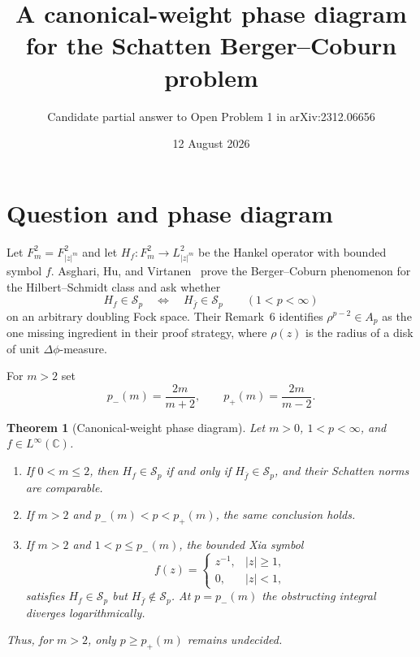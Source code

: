 \documentclass[11pt]{article}
\title{A canonical-weight phase diagram for the Schatten Berger--Coburn problem}
\author{Candidate partial answer to Open Problem 1 in arXiv:2312.06656}
\date{12 August 2026}
\newtheorem{theorem}{Theorem}
\newcommand{\C}{\mathbb C}
\newcommand{\Sp}{\mathcal S}
\begin{document}
\maketitle

\begin{center}
\end{center}

\section{Question and phase diagram}

Let $F^2_m=F^2_{|z|^m}$ and let $H_f:F^2_m\to L^2_{|z|^m}$ be the Hankel
operator with bounded symbol $f$.  Asghari, Hu, and Virtanen~\cite{source}
prove the Berger--Coburn phenomenon for the Hilbert--Schmidt class and ask
whether
\[
 H_f\in\Sp_p\quad\Longleftrightarrow\quad H_{\bar f}\in\Sp_p
 \qquad(1<p<\infty)
\]
on an arbitrary doubling Fock space.  Their Remark~6 identifies
$\rho^{p-2}\in A_p$ as the one missing ingredient in their proof strategy,
where $\rho(z)$ is the radius of a disk of unit $\Delta\phi$-measure.

For $m>2$ set
\[
 p_-(m)=\frac{2m}{m+2},\qquad p_+(m)=\frac{2m}{m-2}.
\]

\begin{theorem}[Canonical-weight phase diagram]\label{thm:phase}
Let $m>0$, $1<p<\infty$, and $f\in L^\infty(\C)$.
\begin{enumerate}
\item If $0<m\leq2$, then $H_f\in\Sp_p$ if and only if
      $H_{\bar f}\in\Sp_p$, and their Schatten norms are comparable.
\item If $m>2$ and $p_-(m)<p<p_+(m)$, the same conclusion holds.
\item If $m>2$ and $1<p\leq p_-(m)$, the bounded Xia symbol
\begin{equation}\label{eq:xia}
 f(z)=\begin{cases}z^{-1},&|z|\geq1,\\0,&|z|<1,
 \end{cases}
\end{equation}
satisfies $H_f\in\Sp_p$ but $H_{\bar f}\notin\Sp_p$.
At $p=p_-(m)$ the obstructing integral diverges logarithmically.
\end{enumerate}
Thus, for $m>2$, only $p\geq p_+(m)$ remains undecided.
\end{theorem}
\end{document}
